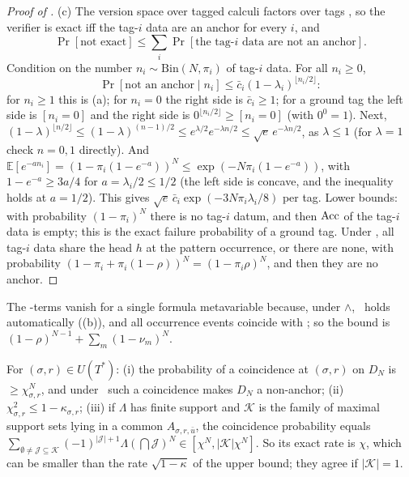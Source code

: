 \begin{proof}[Proof of ]
(c) The version space over tagged calculi factors over tags \citep{claude2026whatfollows}, so the verifier is exact iff the tag-$i$ data are an anchor for every $i$, and
\[
\Pr[\text{not exact}]\le\sum_i\Pr[\text{the tag-}i\text{ data are not an anchor}].
\] Condition on the number $n_i\sim\mathrm{Bin}(N,\pi_i)$ of tag-$i$ data. For all $n_i\ge0$,
\[
\Pr[\text{not an anchor}\mid n_i]\le\bar c_i(1-\lambda_i)^{\lfloor n_i/2\rfloor}:
\]
for $n_i\ge1$ this is (a); for $n_i=0$ the right side is $\bar c_i\ge1$; for a ground tag the left side is $[n_i=0]$ and the right side is $0^{\lfloor n_i/2\rfloor}\ge[n_i=0]$ (with $0^0=1$). Next, $(1-\lambda)^{\lfloor n/2\rfloor}\le(1-\lambda)^{(n-1)/2}\le e^{\lambda/2}e^{-\lambda n/2}\le\sqrt e\,e^{-\lambda n/2}$, as $\lambda\le1$ (for $\lambda=1$ check $n=0,1$ directly). And $\mathbb E[e^{-an_i}]=(1-\pi_i(1-e^{-a}))^N\le\exp(-N\pi_i(1-e^{-a}))$, with $1-e^{-a}\ge3a/4$ for $a=\lambda_i/2\le1/2$ (the left side is concave, and the inequality holds at $a=1/2$). This gives $\sqrt e\,\bar c_i\exp(-3N\pi_i\lambda_i/8)$ per tag. Lower bounds: with probability $(1-\pi_i)^N$ there is no tag-$i$ datum, and then $\mathrm{Acc}$ of the tag-$i$ data is empty; this is the exact failure probability of a ground tag. Under \Rich, all tag-$i$ data share the head $h$ at the pattern occurrence, or there are none, with probability $(1-\pi_i+\pi_i(1-\rho))^N=(1-\pi_i\rho)^N$, and then they are no anchor.
\end{proof}

The \evU-terms vanish for a single formula metavariable because, under \evR$\wedge$\evN, \evU\ holds automatically ((b)), and all occurrence events coincide with \evR; so the bound is $(1-\rho)^{N-1}+\sum_m(1-\nu_m)^N$.

\begin{proposition}\label{prop:single:kappa}
For $(\sigma,r)\in U(T^*)$: (i) the probability of a coincidence at $(\sigma,r)$ on $D_N$ is $\ge\chi_{\sigma,r}^N$, and under \Rich\ such a coincidence makes $D_N$ a non-anchor; (ii) $\chi_{\sigma,r}^2\le1-\kappa_{\sigma,r}$; (iii) if $\Lambda$ has finite support and $\mathcal K$ is the family of maximal support sets lying in a common $A_{\sigma,r,\bar u}$, the coincidence probability equals $\sum_{\emptyset\neq\mathcal J\subseteq\mathcal K}(-1)^{|\mathcal J|+1}\Lambda(\bigcap\mathcal J)^N\in[\chi^N,|\mathcal K|\chi^N]$. So its exact rate is $\chi$, which can be smaller than the rate $\sqrt{1-\kappa}$ of the upper bound; they agree if $|\mathcal K|=1$.
\end{proposition}

